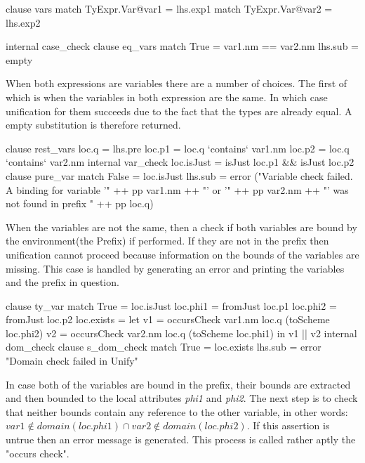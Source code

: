 \begin{code}
   clause vars
     match TyExpr.Var@var1 = lhs.exp1
     match TyExpr.Var@var2 = lhs.exp2
     
     internal case_check
       clause eq_vars
         match True = var1.nm == var2.nm
         lhs.sub = empty
\end{code}
When both expressions are variables there are a number of choices. The first of which is when the variables in both expression are the same. In which case unification for them succeeds due to the fact that the types are already equal. A empty substitution is therefore returned.

\begin{code}
    clause rest_vars
      loc.q  = lhs.pre
      loc.p1 = loc.q `contains` var1.nm
      loc.p2 = loc.q `contains` var2.nm
      internal var_check
        loc.isJust    = isJust loc.p1 && isJust loc.p2
        clause pure_var
          match False = loc.isJust
          lhs.sub = error ("Variable check failed. A binding for variable '" ++ pp var1.nm ++ "' or '" ++ pp var2.nm ++ "' was not found in prefix " ++ pp loc.q)
\end{code}
When the variables are not the same, then a check if both variables are bound by the environment(the Prefix) if performed. If they are not in the prefix then unification cannot proceed because information on the bounds of the variables are missing. This case is handled by generating an error and printing the variables and the prefix in question.

\begin{code} 
   clause ty_var
     match True  = loc.isJust
     loc.phi1 = fromJust loc.p1
     loc.phi2 = fromJust loc.p2
     loc.exists = let v1 = occursCheck var1.nm loc.q (toScheme loc.phi2)
                      v2 = occursCheck var2.nm loc.q (toScheme loc.phi1)
                  in v1 || v2
     internal dom_check
       clause s_dom_check
         match True  = loc.exists
         lhs.sub = error "Domain check failed in Unify"
\end{code}
In case both of the variables are bound in the prefix, their bounds are extracted and then bounded to the local attributes \emph{phi1} and \emph{phi2}. The next step is to check that neither bounds contain any reference to the other variable, in other words: $var1 \notin domain(loc.phi1) \cap var2 \notin domain(loc.phi2)$. If this assertion is untrue then an error message is generated. This process is called rather aptly the "occurs check".

